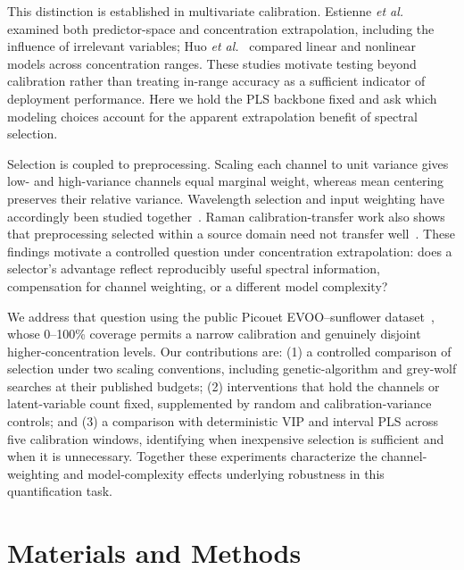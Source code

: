 This distinction is established in multivariate calibration. Estienne \textit{et al.}~\cite{estienne2001} examined both predictor-space and concentration extrapolation, including the influence of irrelevant variables; Huo \textit{et al.}~\cite{huo2024} compared linear and nonlinear models across concentration ranges. These studies motivate testing beyond calibration rather than treating in-range accuracy as a sufficient indicator of deployment performance. Here we hold the PLS backbone fixed and ask which modeling choices account for the apparent extrapolation benefit of spectral selection.

Selection is coupled to preprocessing. Scaling each channel to unit variance gives low- and high-variance channels equal marginal weight, whereas mean centering preserves their relative variance. Wavelength selection and input weighting have accordingly been studied together~\cite{silalahi2020}. Raman calibration-transfer work also shows that preprocessing selected within a source domain need not transfer well~\cite{umprecht2025}. These findings motivate a controlled question under concentration extrapolation: does a selector's advantage reflect reproducibly useful spectral information, compensation for channel weighting, or a different model complexity?

We address that question using the public Picouet EVOO--sunflower dataset~\cite{picouet2023}, whose 0--100\% coverage permits a narrow calibration and genuinely disjoint higher-concentration levels. Our contributions are: (1) a controlled comparison of selection under two scaling conventions, including genetic-algorithm and grey-wolf searches at their published budgets; (2) interventions that hold the channels or latent-variable count fixed, supplemented by random and calibration-variance controls; and (3) a comparison with deterministic VIP and interval PLS across five calibration windows, identifying when inexpensive selection is sufficient and when it is unnecessary. Together these experiments characterize the channel-weighting and model-complexity effects underlying robustness in this quantification task.

\section{Materials and Methods}
